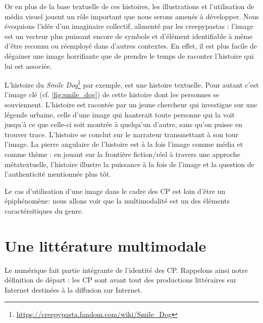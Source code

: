 \documentclass[12pt,a4paper,oneside,titlepage]{book} %
\begin{document}
Or en plus de la base textuelle de ces histoires, les illustrations et l'utilisation de média visuel jouent un rôle important que nous serons amenés à développer. Nous évoquions l'idée d'un imaginaire collectif, alimenté par les creepypastas : l'image est un vecteur plus puissant encore de symbole et d'élément identifiable à même d'être reconnu ou réemployé dans d'autres contextes. En effet, il est plus facile de dégainer une image horrifiante que de prendre le temps de raconter l'histoire qui lui est associée.

L'histoire du \textit{Smile Dog}\footnote{\url{https://creepypasta.fandom.com/wiki/Smile_Dog}} par exemple, est une histoire textuelle. Pour autant c'est l'image clé (cf. \ref{fig:smile_dog}) de cette histoire dont les personnes se souviennent. L'histoire est racontée par un jeune chercheur qui investigue sur une légende urbaine, celle d'une image qui hanterait toute personne qui la voit jusqu'à ce que celle-ci soit montrée à quelqu'un d'autre, sans qu'on puisse en trouver trace. L'histoire se conclut sur le narrateur transmettant à son tour l'image.
La pierre angulaire de l'histoire est à la fois l'image comme média et comme thème : en jouant sur la frontière fiction/réel à travers une approche métatextuelle, l'histoire illustre la puissance à la fois de l'image et la question de l'authenticité mentionnée plus tôt.

Le cas d'utilisation d'une image dans le cadre des CP est loin d'être un épiphénomène: nous allons voir que la multimodalité est un des éléments caractérsitiques du genre.
\section{Une littérature multimodale}

Le numérique fait partie intégrante de l’identité des CP. Rappelons ainsi notre définition de départ : les CP sont avant tout des productions littéraires sur Internet destinées à la diffusion sur Internet. 
\end{document}
